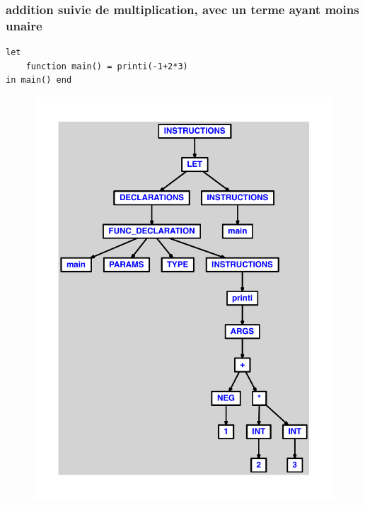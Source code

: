 \documentclass{article}
\begin{document}
\subsubsection{addition suivie de multiplication, avec un terme ayant moins unaire}
\begin{lstlisting}
let
	function main() = printi(-1+2*3)
in main() end
\end{lstlisting}
\newpage
\begin{figure}[H]
\centering
\includegraphics[max width=\textwidth]{ast/ast_69.pdf}
\end{figure}
\newpage
\end{document}

